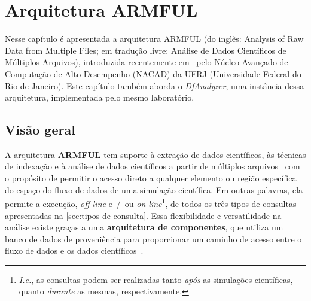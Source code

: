 
\chapter{Arquitetura ARMFUL}%
\label{chap:arquitetura-armful}

Nesse capítulo é apresentada a arquitetura  ARMFUL (do inglês: Analysis of Raw Data from Multiple Files; em tradução livre: Análise de Dados Científicos de Múltiplos Arquivos), introduzida recentemente em~\cite{silva2016situ,silva2017raw} pelo  Núcleo Avançado de Computação de Alto Desempenho (NACAD) da  UFRJ (Universidade Federal do Rio de Janeiro). Este capítulo também aborda o \textit{DfAnalyzer}, uma instância dessa arquitetura, implementada pelo mesmo laboratório.

\section{Visão geral}

A arquitetura \textbf{ARMFUL} tem suporte à extração de dados científicos, às técnicas de indexação e à análise de dados científicos a partir de múltiplos arquivos~\cite{silva2016situ} com o propósito de permitir o acesso direto a qualquer elemento ou região específica do espaço do fluxo de dados de uma simulação científica. Em outras palavras, ela permite a execução, \textit{off-line} e~/~ou \textit{on-line}\footnote{\textit{I.e.}, as consultas podem ser realizadas tanto \emph{após} as simulações científicas, quanto \emph{durante} as mesmas, respectivamente.}, de todos os três tipos de consultas apresentadas na \autoref{sec:tipos-de-consulta}. Essa flexibilidade e versatilidade na análise existe graças a uma \textbf{arquitetura de componentes}, que utiliza um banco de dados de proveniência para proporcionar um caminho de acesso entre o fluxo de dados e os dados científicos~\cite{silva2017raw}.

